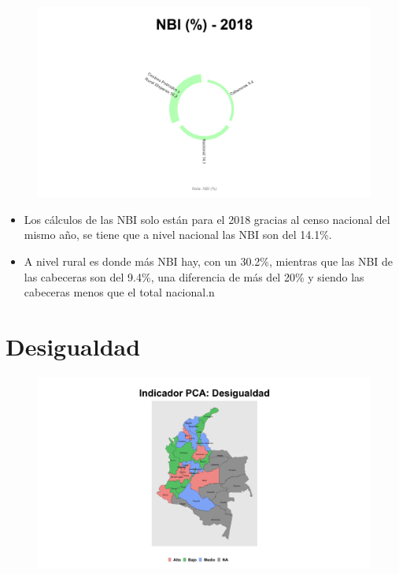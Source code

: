     \begin{figure}[H]
        \caption[Necesidades Básicas Insatisfechas por zonas y nacional ]{\label{nbi_zonas} }
        \begin{center}
        \includegraphics[width=\textwidth,keepaspectratio]{img/var_276_static.png}
        \end{center}
    \end{figure}
            \begin{itemize}
                    \item Los cálculos de las NBI solo están para el 2018 gracias al censo nacional del mismo año, se tiene que a nivel nacional las NBI son del 14.1\%.
                    \item A nivel rural es donde más NBI hay, con un 30.2\%, mientras que las NBI de las cabeceras son del 9.4\%, una diferencia de más del 20\% y siendo las cabeceras menos que el total nacional.n
                    \end{itemize}

\section{Desigualdad}

\begin{figure}[H]
        \caption[Indicador Pulso Social sobre Desigualdad (PCA)]{\label{pca_pobreza} }
        \begin{center}
        \includegraphics[width=\textwidth,keepaspectratio]{pca_clusters/pca_desigualdad_pca.png}
        \end{center}
    \end{figure}

